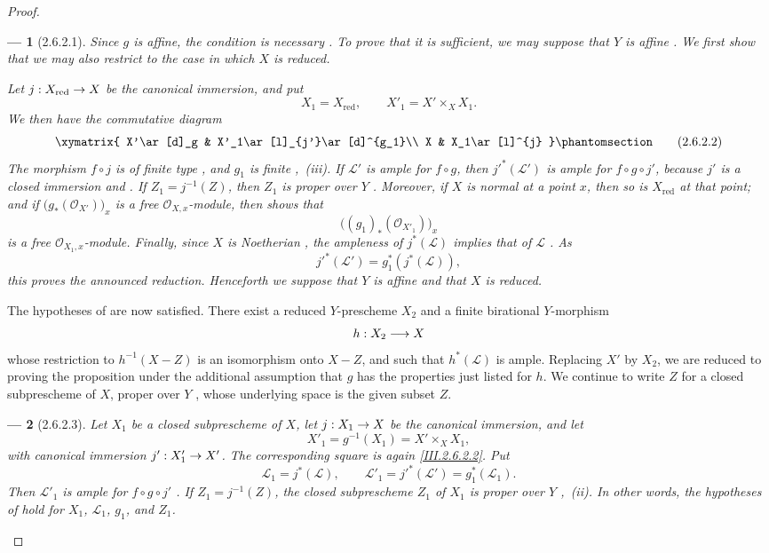 \documentclass[oneside]{amsart}
\theoremstyle{ega-env-style}
\newtheorem*{env}{---}
\theoremstyle{ega-thm-env-style}
\theoremstyle{ega-defn-env-style}
\def\mathcal{\mathscr}
\def\sh{\mathcal}                   %
\renewcommand{\to}{\mathchoice{\longrightarrow}{\rightarrow}{\rightarrow}{\rightarrow}}
\let\EGAOriginalLabel\label
\renewcommand{\label}[1]{\phantomsection\EGAOriginalLabel{#1}}
\begin{document}
\begin{proof}
\begin{env}[2.6.2.1]
\label{III.2.6.2.1}
Since $g$ is affine, the condition is necessary .
To prove that it is sufficient, we may suppose that $Y$ is affine
.
We first show that we may also restrict to the case in which $X$ is
reduced.

Let $j:X_{\mathrm{red}}\to X$ be the canonical immersion, and put
\[
  X_1=X_{\mathrm{red}},
  \qquad
  X'_1=X'\times_X X_1.
\]
We then have the commutative diagram
\[
  \xymatrix{
    X'\ar[d]_g &
    X'_1\ar[l]_{j'}\ar[d]^{g_1}\\
    X &
    X_1\ar[l]^{j}
  }
  \label{III.2.6.2.2}\tag{2.6.2.2}
\]
The morphism $f\circ j$ is of finite type , and
$g_1$ is finite ,~(iii).
If $\sh{L}'$ is ample for $f\circ g$, then
$j'^*(\sh{L}')$ is ample for $f\circ g\circ j'$, because $j'$ is a
closed immersion  and .
If $Z_1=j^{-1}(Z)$, then $Z_1$ is proper over $Y$
.
Moreover, if $X$ is normal at a point $x$, then so is $X_{\mathrm{red}}$
at that point; and if
$\bigl(g_*(\sh{O}_{X'})\bigr)_x$ is a free $\sh{O}_{X,x}$-module,
then  shows that
\[
  \bigl((g_1)_*(\sh{O}_{X'_1})\bigr)_x
\]
is a free $\sh{O}_{X_1,x}$-module.
Finally, since $X$ is Noetherian , the ampleness of
$j^*(\sh{L})$ implies that of $\sh{L}$ .
As
\[
  j'^*(\sh{L}')=g_1^*(j^*(\sh{L})),
\]
this proves the announced reduction.
Henceforth we suppose that $Y$ is affine and that $X$ is reduced.
\end{env}

The hypotheses of  are now satisfied.
There exist a reduced $Y$-prescheme $X_2$ and a finite birational
$Y$-morphism
\[
  h:X_2\to X
\]
whose restriction to $h^{-1}(X-Z)$ is an isomorphism onto $X-Z$, and
such that $h^*(\sh{L})$ is ample.
Replacing $X'$ by $X_2$, we are reduced to proving the proposition under
the additional assumption that $g$ has the properties just listed for
$h$.
We continue to write $Z$ for a closed subprescheme of $X$, proper over
$Y$ , whose underlying space is the given subset
$Z$.

\begin{env}[2.6.2.3]
\label{III.2.6.2.3}
Let $X_1$ be a closed subprescheme of $X$, let $j:X_1\to X$ be the
canonical immersion, and let
\[
  X'_1=g^{-1}(X_1)=X'\times_X X_1,
\]
with canonical immersion $j':X'_1\to X'$.
The corresponding square is again \eqref{III.2.6.2.2}.
Put
\[
  \sh{L}_1=j^*(\sh{L}),
  \qquad
  \sh{L}'_1=j'^*(\sh{L}')=g_1^*(\sh{L}_1).
\]
Then $\sh{L}'_1$ is ample for $f\circ g\circ j'$
.
If $Z_1=j^{-1}(Z)$, the closed subprescheme $Z_1$ of $X_1$ is proper
over $Y$ ,~(ii).
In other words, the hypotheses of  hold for
$X_1$, $\sh{L}_1$, $g_1$, and $Z_1$.
\end{env}


\end{proof}
\end{document}
